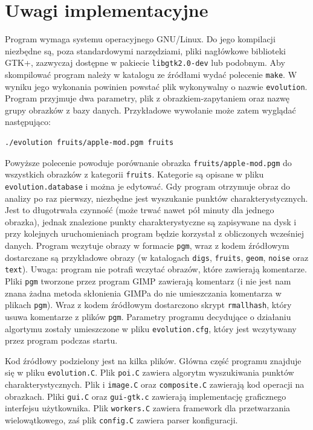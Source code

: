 \documentclass[a4paper,12pt,leqno]{article}
\begin{document}
\section{Uwagi implementacyjne}

Program wymaga systemu operacyjnego GNU/Linux. Do jego kompilacji niezbędne są, poza standardowymi narzędziami, pliki nagłówkowe biblioteki GTK+,
zazwyczaj dostępne w pakiecie \texttt{libgtk2.0-dev} lub podobnym. Aby skompilować program należy w katalogu ze źródłami wydać polecenie \texttt{make}.
W wyniku jego wykonania powinien powstać plik wykonywalny o nazwie \texttt{evolution}. Program przyjmuje dwa parametry, plik z obrazkiem-zapytaniem oraz
nazwę grupy obrazków z bazy danych. Przykładowe wywołanie może zatem wyglądać następująco:
\begin{verbatim}./evolution fruits/apple-mod.pgm fruits\end{verbatim}
Powyższe polecenie powoduje porównanie obrazka \texttt{fruits/apple-mod.pgm} do wszystkich obrazków z kategorii \texttt{fruits}.
Kategorie są opisane w pliku \texttt{evolution.database} i można je edytować. Gdy program otrzymuje obraz do analizy po raz pierwszy, niezbędne jest
wyszukanie punktów charakterystycznych. Jest to długotrwała czynność (może trwać nawet pół minuty dla jednego obrazka), jednak znalezione punkty
charakterystyczne są zapisywane na dysk i przy kolejnych uruchomieniach program będzie korzystał z obliczonych wcześniej danych. Program wczytuje
obrazy w formacie \texttt{pgm}, wraz z kodem źródłowym dostarczane są przykładowe obrazy (w katalogach \texttt{digs}, \texttt{fruits}, \texttt{geom},
\texttt{noise} oraz \texttt{text}). Uwaga: program nie potrafi wczytać obrazów, które zawierają komentarze. Pliki \texttt{pgm} tworzone przez program
GIMP zawierają komentarz (i nie jest nam znana żadna metoda skłonienia GIMPa do nie umieszczania komentarza w plikach \texttt{pgm}). Wraz z kodem
źródłowym dostarczono skrypt \texttt{rmallhash}, który usuwa komentarze z plików \texttt{pgm}. Parametry programu decydujące o działaniu algortymu
zostały umieszczone w pliku \texttt{evolution.cfg}, który jest wczytywany przez program podczas startu.

Kod źródłowy podzielony jest na kilka plików. Główna część programu znajduje się w pliku \texttt{evolution.C}. Plik \texttt{poi.C} zawiera algorytm
wyszukiwania punktów charakterystycznych. Plik i \texttt{image.C} oraz \texttt{composite.C} zawierają kod operacji na obrazkach. Pliki \texttt{gui.C}
oraz \texttt{gui-gtk.c} zawierają implementację graficznego interfejsu użytkownika. Plik \texttt{workers.C} zawiera framework dla przetwarzania
wielowątkowego, zaś plik \texttt{config.C} zawiera parser konfiguracji.
\end{document}
